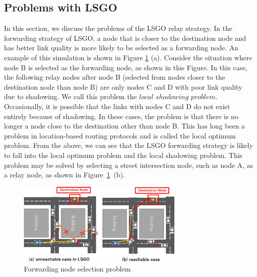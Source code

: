 \documentclass[conference]{IEEEtran}
\begin{document}
\subsection{Problems with LSGO}

In this section, we discuss the problems of the LSGO relay strategy.  
In the forwarding strategy of LSGO, a node that is closer to the destination node and has better link quality is more likely to be selected as a forwarding node. 
An example of this simulation is shown in Figure \ref{fig:LSGO-route} (a). 
Consider the situation where node B is selected as the forwarding node, as shown in this Figure. 
In this case, the following relay nodes after node B (selected from nodes closer to the destination node than node B) are only nodes C and D with poor link quality due to shadowing.  
We call this problem the $local$ $shadowing$ $problem$. 
Occasionally, it is possible  that the links with nodes C and D do not exist entirely  because of  shadowing. 
In these cases, the problem is that there is no longer a node close to the destination other than  node B. 
This has long been a problem in  location-based routing protocols and is called the local optimum problem. 
From the above, we can see that the LSGO forwarding strategy is likely to fall into the local optimum problem and the local shadowing problem. This problem may be solved by selecting a street intersection node, such as node A, as a relay node, as shown in \mbox{Figure \ref{fig:LSGO-route} (b)}. 




\begin{figure}[!ht]
\centering
\includegraphics[width=80mm]{figures/efficient_route.eps}
\caption{Forwarding node selection problem}
\label{fig:LSGO-route}
\end{figure}


\end{document}
